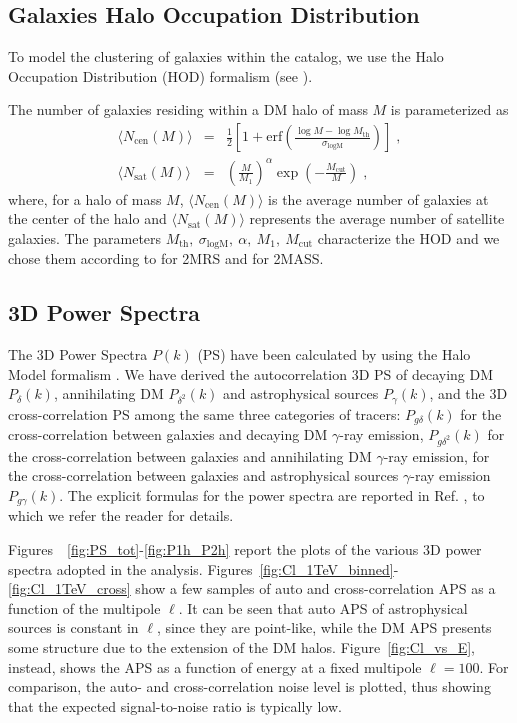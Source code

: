 \subsection{Galaxies Halo Occupation Distribution}
To model the clustering of galaxies within the catalog, we use the Halo Occupation Distribution (HOD) formalism (see  \cite{Zheng:2004id,Berlind:2001xk,Cooray:2002dia}).


The number of galaxies residing within a DM halo of mass $M$ is parameterized as
\begin{eqnarray}
\langle N_\textrm{cen}(M)\rangle &=& \frac{1}{2}\left[1+\textrm{erf}\left(\frac{\log M-\log M_\textrm{th}}{\sigma_\textrm{logM}}\right)\right]\;, \label{eq:HOD1}\\
\langle N_\textrm{sat}(M)\rangle &=& \left( \frac{M}{M_1} \right)^\alpha \exp{\left(-\frac{M_\textrm{cut}}{M}\right)}\;,\label{eq:HOD2}
\end{eqnarray}
where, for a halo of mass $M$, $\langle N_\textrm{cen}(M) \rangle$ is the average number of galaxies at the center of the halo and $\langle N_\textrm{sat}(M)\rangle$ represents the average number of satellite galaxies.
The parameters $M_\textrm{th}, \ \sigma_\textrm{logM}, \ \alpha, \ M_1, \ M_\textrm{cut}$ characterize the HOD and we chose them according to 
\cite{Ando:2017wff} for 2MRS and \cite{Cuoco:2015rfa} for 2MASS.



\subsection{3D Power Spectra}
The 3D Power Spectra $P(k)$  (PS) have been calculated by using the Halo Model formalism \cite{Cooray:2002dia}. We have derived the autocorrelation 3D PS of decaying DM $P_\delta(k)$, annihilating DM $P_{\delta^2}(k)$ and astrophysical sources $P_\gamma(k)$, and the 3D cross-correlation PS among the same three categories of tracers: $P_{g\delta}(k)$ for the cross-correlation between galaxies and decaying DM $\gamma$-ray emission,  $P_{g\delta^2}(k)$ for the cross-correlation between galaxies and annihilating DM $\gamma$-ray emission, for the cross-correlation between galaxies and astrophysical sources $\gamma$-ray emission $P_{g\gamma}(k)$. The explicit formulas for the power spectra are reported in Ref. \cite{Cuoco:2015rfa}, to which we refer the reader for details. 

Figures~\ \ref{fig:PS_tot}-\ref{fig:P1h_P2h} report the plots of the various 3D power spectra adopted in the analysis. Figures~\ref{fig:Cl_1TeV_binned}-\ref{fig:Cl_1TeV_cross} show a few samples of auto and cross-correlation APS as a function of the multipole $\ell$. It can be seen that auto APS of astrophysical sources is constant in $\ell$, since they are point-like, while the DM APS presents some structure due to the extension of the DM halos. Figure~\ref{fig:Cl_vs_E}, instead, shows the APS as a function of energy at a fixed multipole $\ell=100$. For comparison, the auto- and cross-correlation noise level is plotted, thus showing that the expected signal-to-noise ratio is typically low.



